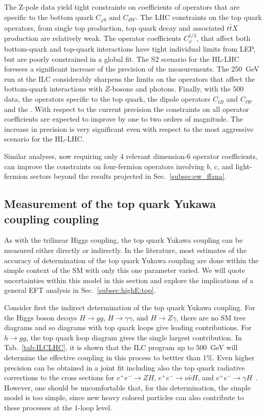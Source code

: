 The Z-pole data yield tight constraints on coefficients of operators that are specific to 
the bottom quark $C_{\varphi b}$ and $C_{dW}$. The LHC constraints on the
top quark operators, from single top production, top quark decay and associated $t\bar{t}X$ 
production are relatively weak. The operator coefficients $C^{1/3}_{\varphi}$, that affect
both bottom-quark and top-quark interactions have tight individual limits from LEP, but 
are poorly constrained in a global fit. The S2 scenario for the HL-LHC foresees a significant
increase of the precision of the measurements. The 250~GeV run at the ILC considerably
sharpens the limits on the operators that affect the bottom-quark interactions with $Z$-bosons
and photons. Finally, with the 500~\GeV{} data, the operators specific to the top quark, 
the dipole operators $C_{tB}$ and $C_{tW}$ and the . 
With respect to the current precision the constraints on all operator coefficients are expected
to improve by one to two orders of magnitude. The increase in precision is very significant even
with respect to the most aggressive scenario for the HL-LHC.

Similar analyses, now requiring  only 4 relevant dimension-6 operator coefficients, can
improve the constraints on four-fermion operators involving $b$, $c$,
and light-fermion sectors beyond the results projected in
Sec.~\ref{subsec:ew_ffana}.


\subsection{Measurement of the top quark Yukawa coupling coupling}
\label{subsec:top:topYukawa}


As with the trilinear Higgs coupling, the top quark Yukawa coupling can be
measured either directly or indirectly.  In the literature, most
estimates of the accuracy of determination of the top quark Yukawa
coupling are done within the simple context of the SM with only this
one parameter varied. We will quote uncertainties
within this model in this section and explore the implications of a general 
EFT analysis in Sec.~\ref{subsec:highE:top}.

Consider first the indirect determination of the top quark Yukawa coupling.
For the Higgs boson decays $H\to gg$, $H\to \gamma\gamma$, and $H\to Z \gamma$, 
there are no SM tree diagrams and so diagrams with top quark loops give leading contributions.  
For $h\to gg$, the top quark loop diagram gives the single largest
contribution. In Tab.~\ref{tab:ILCLHC}, it is shown that the ILC
program up to 500~GeV will determine the effective coupling in this process to bettter
than 1\%. Even higher precision can be obtained in a joint fit
including also the top quark radiative corrections to the cross
sections for $e^+e^- \rightarrow ZH$, $e^+e^- \rightarrow \nu\bar\nu
H$, and $e^+e^- \to  \gamma H$~\cite{Boselli:2018zxr}. However, one
should be uncomfortable that, for this determination, the simple model is
too simple, since new heavy colored particles can also contribute to
these processes at the 1-loop level. 

